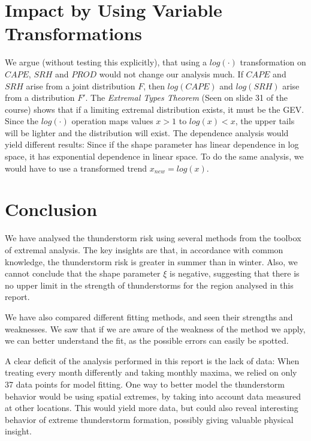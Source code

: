 \documentclass[10pt,conference,compsocconf]{IEEEtran}
\begin{document}
\section*{Impact by Using Variable Transformations}
We argue (without testing this explicitly), that using a $log(\cdot)$ transformation on $CAPE$, $SRH$ and $PROD$ would not change our analysis much. If $CAPE$ and $SRH$ arise from a joint distribution $F$, then $log(CAPE)$ and $log(SRH)$ arise from a distribution $F'$. The \textit{Extremal Types Theorem} (Seen on slide 31 of the course) shows that if a limiting extremal distribution exists, it must be the GEV. Since the $log(\cdot)$ operation maps values $x>1$ to $log(x)<x$, the upper tails will be lighter and the distribution will exist. The dependence analysis would yield different results: Since if the shape parameter has linear dependence in log space, it has exponential dependence in linear space. To do the same analysis, we would have to use a transformed trend $x_{new}= log(x)$. 

\section*{Conclusion}
We have analysed the thunderstorm risk using several methods from the toolbox of extremal analysis. The key insights are that, in accordance with common knowledge, the thunderstorm risk is greater in summer than in winter. Also, we cannot conclude that the shape parameter $\xi$ is negative, suggesting that there is no upper limit in the strength of thunderstorms for the region analysed in this report.
\par
We have also compared different fitting methods, and seen their strengths and weaknesses. We saw that if we are aware of the weakness of the method we apply, we can better understand the fit, as the possible errors can easily be spotted. 
\par
A clear deficit of the analysis performed in this report is the lack of data: When treating every month differently and taking monthly maxima, we relied on only 37 data points for model fitting. One way to better model the thunderstorm behavior would be using spatial extremes, by taking into account data measured at other locations. This would yield more data, but could also reveal interesting behavior of extreme thunderstorm formation, possibly giving valuable physical insight. 






\end{document}
